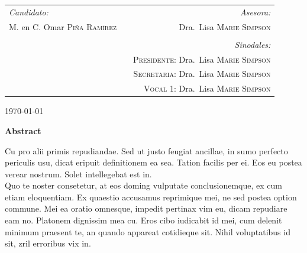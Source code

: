 \begin{titlepage}
\begin{center}
	\vspace{2em}
	\begin{tabular}{lp{1cm}r}
		  \emph{Candidato:} && 
		  \emph{Asesora:}\\
		   M. en C. Omar \textsc{Piña Ramírez} &&
		   Dra.~Lisa \textsc{Marie Simpson}\\\\[2em]
  	          &&
 	       \emph{Sinodales:}\\
		    \vspace{1.5em}&&
		    \textsc{Presidente:} Dra.~Lisa \textsc{Marie Simpson}\\
		    \vspace{1.5em}&&
		    \textsc{Secretaria:} Dra.~Lisa \textsc{Marie Simpson}\\  
		    \vspace{1.5em}&&
		    \textsc{Vocal 1:} Dra.~Lisa \textsc{Marie Simpson}\\  		  
	\end{tabular}


	\vfill
	\begin{flushright}
		\normalsize\today
	\end{flushright}

\end{center}

\end{titlepage}

\newpage
\vspace{1em}
\textbf{\Large Abstract}\\[-1em]
\begin{center}
\begin{minipage}{.92\textwidth}
Cu pro alii primis repudiandae. Sed ut justo feugiat ancillae, in sumo perfecto periculis usu, dicat eripuit definitionem ea sea. Tation facilis per ei. Eos eu postea verear nostrum. Solet intellegebat est in.\\[.2em]

Quo te noster consetetur, at eos doming vulputate conclusionemque, ex cum etiam eloquentiam. Ex quaestio accusamus reprimique mei, ne sed postea option commune. Mei ea oratio omnesque, impedit pertinax vim eu, dicam repudiare eam no. Platonem dignissim mea cu. Eros cibo iudicabit id mei, cum delenit minimum praesent te, an quando appareat cotidieque sit. Nihil voluptatibus id sit, zril erroribus vix in.

\end{minipage}
\end{center}

 
\tableofcontents